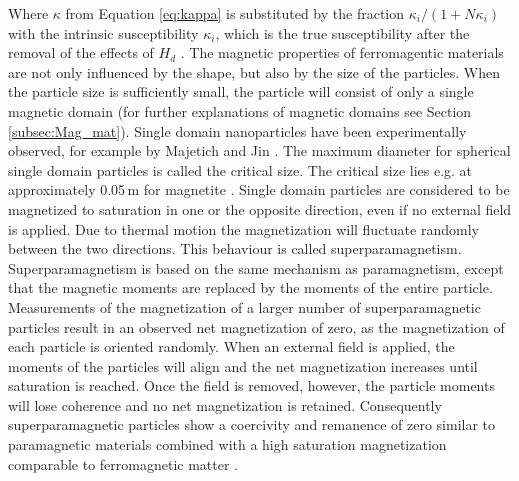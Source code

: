 Where $\kappa$ from Equation \ref{eq:kappa} is substituted by the fraction $\kappa_{i}/(1+N\kappa_{i})$ with the intrinsic susceptibility $\kappa_{i}$, which is the true susceptibility after the removal of the effects of $H_{d}$ \cite{FranzrebHabil}\cite{svoboda2004magnetic}.\newline 
The magnetic properties of ferromagentic materials are not only influenced by the shape, but also by the size of the particles. When the particle size is sufficiently small, the particle will consist of only a single magnetic domain (for further explanations of magnetic domains see Section \ref{subsec:Mag_mat}). Single domain nanoparticles have been experimentally observed, for example by Majetich and Jin \cite{majetich1999magnetization}. The maximum diameter for spherical single domain particles is called the critical size. The critical size lies e.g. at approximately 0.05\,\textmu m for magnetite \cite{svoboda2004magnetic}\cite{butler1975theoretical}. Single domain particles are considered to be magnetized to saturation in one or the opposite direction, even if no external field is applied. Due to thermal motion the magnetization will fluctuate randomly between the two directions. This behaviour is called superparamagnetism.
Superparamagnetism is based on the same mechanism as paramagnetism, except that the magnetic moments are replaced by the moments of the entire particle. Measurements of the magnetization of a larger number of superparamagnetic particles result in an observed net magnetization of zero, as the magnetization of each particle is oriented randomly. When an external field is applied, the moments of the particles will align and the net magnetization increases until saturation is reached. Once the field is removed, however, the particle moments will lose coherence and no net magnetization is retained. Consequently superparamagnetic particles show a coercivity and remanence of zero similar to paramagnetic materials combined with a high saturation magnetization comparable to ferromagnetic matter \cite{svoboda2004magnetic}\cite{FranzrebHabil}.      
    
